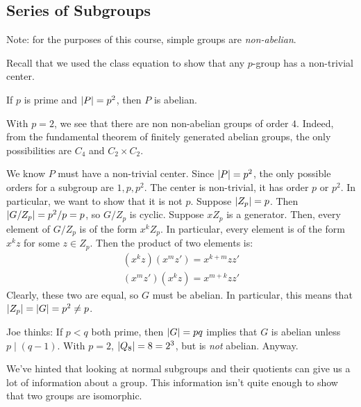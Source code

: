 \subsection{Series of Subgroups}

Note: for the purposes of this course, simple groups are \textit{non-abelian}.

Recall that we used the class equation to show that any $ p $-group has a non-trivial center.
\begin{thm}
    If $ p $ is prime and $ \abs{P} = p^{2} $, then $ P $ is abelian.
\end{thm}
\begin{crll}
    With $ p = 2 $, we see that there are non non-abelian groups of order $ 4 $. \vsp
    Indeed, from the fundamental theorem of finitely generated abelian groups,
    the only possibilities are $ C_{4} $ and $ C_{2} \times C_{2} $.
\end{crll}

\begin{pf}[source=Primary Source Material]
    We know $ P $ must have a non-trivial center.
    Since $ \abs{P} = p^{2} $, the only possible orders for a subgroup are $ 1, p, p^{2} $. \vsp
    The center is non-trivial, it has order $ p $ or $ p^{2} $.
    In particular, we want to show that it is not $ p $. \vsp
    Suppose $ \abs{Z_{p}} = p $. Then $ \abs{G/Z_{p}} = p^{2}/p = p $, so $ G/Z_{p} $ is cyclic.
    Suppose $ xZ_{p} $ is a generator.
    Then, every element of $ G/Z_{p} $ is of the form $ x^{k}Z_{p} $. \vsp
    In particular, every element is of the form $ x^{k}z $ for some $ z \in Z_{p} $.
    Then the product of two elements is:
    \begin{gather*}
        (x^{k}z)(x^{m}z') = x^{k+m}zz' \\
        (x^{m}z')(x^{k}z) = x^{m+k}zz'
    \end{gather*}
    Clearly, these two are equal, so $ G $ must be abelian.
    In particular, this means that $ \abs{Z_{p}} = \abs{G} = p^{2} \neq p $.
\end{pf}

Joe thinks: If $ p < q $ both prime, then $ \abs{G} = pq $ implies that $ G $ is abelian
unless $ p \mid (q - 1) $.
With $ p = 2 $, $ \abs{Q_{8}} = 8 = 2^{3} $, but is \textit{not} abelian. Anyway.

\newpage
We've hinted that looking at normal subgroups and their quotients can give us a lot of information
about a group. This information isn't quite enough to show that two groups are isomorphic.

